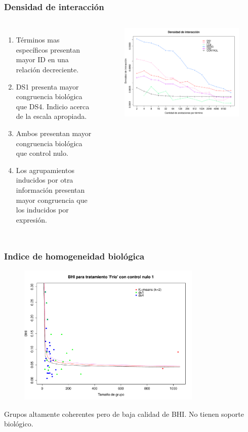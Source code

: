 \documentclass[serif,9pt, t]{beamer}
\newcommand\Fontvi{\fontsize{7}{7.2}\selectfont}
\begin{document}
\begin{frame}\frametitle{Densidad de interacción} 
\begin{columns}[T]
	\Fontvi
	\begin{enumerate}
	\item Términos mas específicos presentan mayor ID en una relación decreciente.
	\item DS1 presenta mayor congruencia biológica que DS4. Indicio acerca de la escala apropiada.
	\item Ambos presentan mayor congruencia biológica que control nulo.
	\item Los agrupamientos inducidos por otra información presentan mayor congruencia que los inducidos por expresión.
	\end{enumerate}
	\begin{figure}
	    	\centering
		\includegraphics[width=1\textwidth]{interacting_densities_bpb.pdf}
	\end{figure}
\end{columns}
\end{frame}

\begin{frame}\frametitle{Indice de homogeneidad biológica} 
\begin{figure}
    	\centering
	\includegraphics[width=0.78\textwidth]{bhi_km_ds1_ds4_control1.pdf}
\end{figure}
\Fontvi
\centering
Grupos altamente coherentes pero de baja calidad de BHI. No tienen soporte biológico.
\end{frame}
\end{document}
